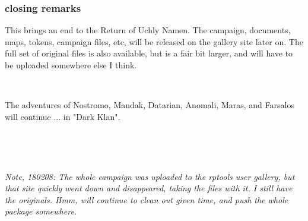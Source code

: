 \subsubsection*{closing remarks}
This brings an end to the Return of Uchly Namen.
The campaign, documents, maps, tokens, campaign files, etc, will be released on the gallery site later on. The full set of original files is also available, but is a fair bit larger, and will have to be uploaded somewhere else I think.

\

The adventures of Nostromo, Mandak, Datarian, Anomali, Maras, and Farsalos will continue ... in "Dark Klan".

\

\

\emph{Note, 180208: The whole campaign was uploaded to the rptools user gallery, but that site quickly went down and disappeared, taking the files with it. I still have the originals. Hmm, will continue to clean out given time, and push the whole package somewhere.}













